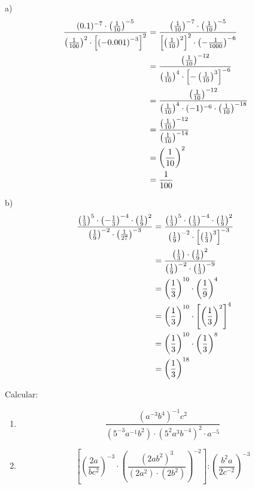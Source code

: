 \begin{solucio}
a)%
\begin{align*}
\frac{(0.1)^{-7}\cdot \left( \frac{1}{10}\right) ^{-5}}{\left( \frac{1}{100}%
\right) ^{2}\cdot \left[ \left( -0.001\right) ^{-3}\right] ^{2}} &=\frac{%
\left( \frac{1}{10}\right) ^{-7}\cdot \left( \frac{1}{10}\right) ^{-5}}{%
\left[ \left( \frac{1}{10}\right) ^{2}\right] ^{2}\cdot \left( -\frac{1}{1000%
}\right) ^{-6}} \\
&=\frac{\left( \frac{1}{10}\right) ^{-12}}{\left( \frac{1}{10}\right)
^{4}\cdot \left[ -\left( \frac{1}{10}\right) ^{3}\right] ^{-6}} \\
&=\frac{\left( \frac{1}{10}\right) ^{-12}}{\left( \frac{1}{10}\right)
^{4}\cdot (-1)^{-6}\cdot \left( \frac{1}{10}\right) ^{-18}} \\
&=\frac{\left( \frac{1}{10}\right) ^{-12}}{\left( \frac{1}{10}\right) ^{-14}%
} \\
&=\left( \frac{1}{10}\right) ^{2} \\
&=\frac{1}{100}
\end{align*}

b)%
\begin{align*}
\frac{\left( \frac{1}{3}\right) ^{5}\cdot \left( -\frac{1}{3}\right)
^{-4}\cdot \left( \frac{1}{9}\right) ^{2}}{\left( \frac{1}{9}\right)
^{-2}\cdot \left( \frac{1}{27}\right) ^{-3}} &=\frac{\left( \frac{1}{3}%
\right) ^{5}\cdot \left( \frac{1}{3}\right) ^{-4}\cdot \left( \frac{1}{9}%
\right) ^{2}}{\left( \frac{1}{9}\right) ^{-2}\cdot \left[ \left( \frac{1}{3}%
\right) ^{3}\right] ^{-3}} \\
&=\frac{\left( \frac{1}{3}\right) \cdot \left( \frac{1}{9}\right) ^{2}}{%
\left( \frac{1}{9}\right) ^{-2}\cdot \left( \frac{1}{3}\right) ^{-9}} \\
&=\left( \frac{1}{3}\right) ^{10}\cdot \left( \frac{1}{9}\right) ^{4} \\
&=\left( \frac{1}{3}\right) ^{10}\cdot \left[ \left( \frac{1}{3}\right) ^{2}%
\right] ^{4} \\
&=\left( \frac{1}{3}\right) ^{10}\cdot \left( \frac{1}{3}\right) ^{8} \\
&=\left( \frac{1}{3}\right) ^{18}
\end{align*}
\end{solucio}

\begin{exercici}
Calcular:

\begin{enumerate}
\item[a)] 
\begin{equation*}
\frac{(a^{-3}b^{4})^{-1}c^{2}}{(5^{-3}a^{-1}b^{2})\cdot
(5^{2}a^{3}b^{-4})^{2}\cdot a^{-5}}
\end{equation*}

\item[b)] 
\begin{equation*}
\left[ \left( \frac{2a}{bc^{2}}\right) ^{-3}\cdot \left( \frac{(2ab^{2})^{3}%
}{(2a^{2})\cdot (2b^{2})}\right) ^{-2}\right] :\left( \frac{b^{2}a}{2c^{-2}}%
\right) ^{-3}
\end{equation*}
\end{enumerate}

\end{exercici}


